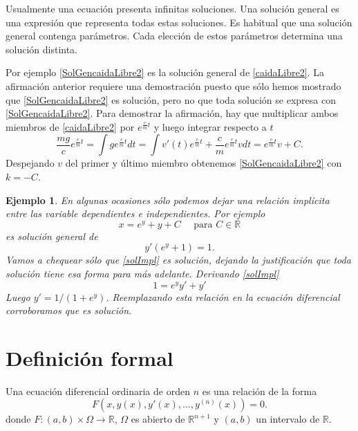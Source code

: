 \documentclass{article}
\newcommand{\rr}{\mathbb{R}}
\newtheorem{ejemplo}{Ejemplo}}
\begin{document}
\begin{definicion} Usualmente una ecuación presenta infinitas soluciones. Una solución general  es una expresión que representa todas estas soluciones. Es habitual que una solución general contenga parámetros. Cada elección de estos parámetros determina una solución distinta.
 \end{definicion}

 Por ejemplo \eqref{SolGencaidaLibre2} es la solución general de \eqref{caidaLibre2}.
  La afirmación anterior requiere una demostración puesto que sólo hemos mostrado que \eqref{SolGencaidaLibre2} es solución, pero no
que toda solución se expresa con \eqref{SolGencaidaLibre2}. Para demostrar la afirmación, hay que multiplicar ambos miembros de \eqref{caidaLibre2} 
por $e^{\frac{c}{m}t}$ y luego integrar respecto a $t$ 
\[\frac{mg}{c}e^{\frac{c}{m}t}=\int ge^{\frac{c}{m}t}dt=\int v'(t)e^{\frac{c}{m}t}+\frac{c}{m}e^{\frac{c}{m}t} vdt=e^{\frac{c}{m}t}v+C.\]
 Despejando $v$ del primer y último miembro obtenemos \eqref{SolGencaidaLibre2} con $k=-C$.

 




\begin{ejemplo} En algunas ocasiones sólo podemos dejar una relación implícita entre las variable dependientes e independientes. Por ejemplo
\begin{equation}\label{solImpl}x=e^y+y+C\quad\text{ para } C\in\rr\end{equation}
es solución general de
\[y'(e^y+1)=1.\]
Vamos a chequear sólo que \eqref{solImpl} es solución, dejando la justificación que toda solución tiene esa forma para más adelante. Derivando \eqref{solImpl}
\[ 1=e^yy'+y'\]
Luego $y'=1/(1+e^{y})$. Reemplazando esta relación  en la ecuación diferencial corroboramos que es solución.
\end{ejemplo}



\section{Definición formal}

\begin{definicion} Una ecuación diferencial ordinaria de orden $n$ es una relación de la forma
\[\boxed{F(x,y(x),y'(x),\ldots,y^{(n)}(x))=0}.\]
donde $F:(a,b)\times \Omega\to\rr$, $\Omega$ es abierto de $\rr^{n+1}$ y $(a,b)$ un intervalo de $\rr$.
  \end{definicion}
\end{document}
